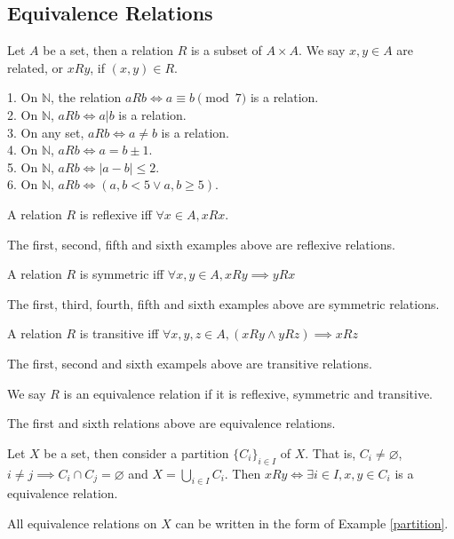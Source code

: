 \subsection{Equivalence Relations}
\begin{definition}
    Let $A$ be a set, then a relation $R$ is a subset of $A\times A$.
    We say $x,y\in A$ are related, or $xRy$, if $(x,y)\in R$.
\end{definition}
\begin{example}
    1. On $\mathbb N$, the relation $aRb\iff a\equiv b\pmod{7}$ is a relation.\\
    2. On $\mathbb N$, $aRb\iff a|b$ is a relation.\\
    3. On any set, $aRb\iff a\neq b$ is a relation.\\
    4. On $\mathbb N$, $aRb\iff a=b\pm 1$.\\
    5. On $\mathbb N$, $aRb\iff |a-b|\le 2$.\\
    6. On $\mathbb N$, $aRb\iff (a,b<5\lor a,b\ge 5)$.
\end{example}
\begin{definition}
    A relation $R$ is reflexive iff $\forall x\in A, xRx$.
\end{definition}
The first, second, fifth and sixth examples above are reflexive relations.
\begin{definition}
    A relation $R$ is symmetric iff $\forall x,y\in A, xRy\implies yRx$
\end{definition}
The first, third, fourth, fifth and sixth examples above are symmetric relations.
\begin{definition}
    A relation $R$ is transitive iff $\forall x,y,z\in A, (xRy\land yRz)\implies xRz$
\end{definition}
The first, second and sixth exampels above are transitive relations.
\begin{definition}
    We say $R$ is an equivalence relation if it is reflexive, symmetric and transitive.
\end{definition}
The first and sixth relations above are equivalence relations.
\begin{example}\label{partition}
    Let $X$ be a set, then consider a partition $\{C_i\}_{i\in I}$ of $X$.
    That is, $C_i\neq \varnothing$, $i\neq j\implies C_i\cap C_j=\varnothing$ and $X=\bigcup_{i\in I}C_i$.
    Then $xRy\iff \exists i\in I, x,y\in C_i$ is a equivalence relation.
\end{example}
\begin{proposition}\label{eq_class}
    All equivalence relations on $X$ can be written in the form of Example \ref{partition}.
\end{proposition}
